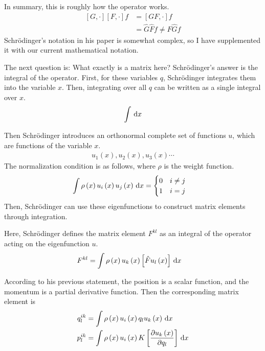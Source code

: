 \documentclass[a4paper, 12pt, oneside, onecolumn]{article}
\newcommand{\cald}{{\rm d}}
\begin{document}
\begin{multicols}{2}
In summary, this is roughly how the operator works.
\begin{align}
	\left[G, \cdot \right] \left[F, \cdot \right] f
	&= \left[GF, \cdot \right] f \\
	&= \hat G \hat F f \neq \hat F \hat G f
\end{align}
Schrödinger's notation in his paper is somewhat complex, so I have supplemented it with our current mathematical notation.

The next question is: What exactly is a matrix here? Schrödinger's answer is the integral of the operator. First, for these variables $q$, Schrödinger integrates them into the variable $x$. Then, integrating over all $q$ can be written as a single integral over $x$.
\begin{align}
	\int \,\cald x
\end{align}

Then Schrödinger introduces an orthonormal complete set of functions $u$, which are functions of the variable $x$.
\begin{align}
	u_1 \left( x \right), u_2 \left( x \right), u_3 \left( x \right) \cdots \nonumber
\end{align}
The normalization condition is as follows, where $\rho$ is the weight function.
\begin{align}
	\int \rho \left( x \right) u_i  \left( x \right) u_j  \left( x \right) \,\cald x
	&=
	\begin{cases}
		0 & i \neq j \\
		1 & i = j
	\end{cases}
\end{align}
Then, Schrödinger can use these eigenfunctions to construct matrix elements through integration.

Here, Schrödinger defines the matrix element $F^{kl}$ as an integral of the operator acting on the eigenfunction $u$.
\begin{align}
	F^{kl}
	&= \int \rho \left( x \right) u_k \left( x \right) \left[ \hat F u_l \left( x \right) \right] \,\cald x
\end{align}

According to his previous statement, the position is a scalar function, and the momentum is a partial derivative function. Then the corresponding matrix element is
\begin{align}
	q_l^{ik}
	&= \int \rho \left( x \right) u_i \left( x \right) q_l u_k \left( x \right) \,\cald x \\
	p_l^{ik}
	&= \int \rho \left( x \right) u_i \left( x \right) K \left[ \frac{\partial u_k \left( x \right)}{\partial q_l} \right] \,\cald x
\end{align}


\end{multicols}
\end{document}
